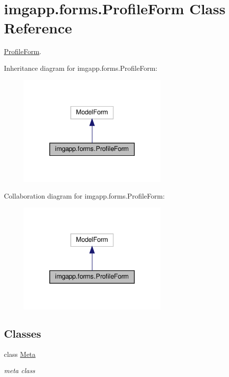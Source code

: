 \hypertarget{classimgapp_1_1forms_1_1ProfileForm}{}\section{imgapp.\+forms.\+Profile\+Form Class Reference}
\label{classimgapp_1_1forms_1_1ProfileForm}


\hyperlink{classimgapp_1_1forms_1_1ProfileForm}{Profile\+Form}.  




Inheritance diagram for imgapp.\+forms.\+Profile\+Form\+:\nopagebreak
\begin{figure}[H]
\begin{center}
\leavevmode
\includegraphics[width=209pt]{classimgapp_1_1forms_1_1ProfileForm__inherit__graph}
\end{center}
\end{figure}


Collaboration diagram for imgapp.\+forms.\+Profile\+Form\+:\nopagebreak
\begin{figure}[H]
\begin{center}
\leavevmode
\includegraphics[width=209pt]{classimgapp_1_1forms_1_1ProfileForm__coll__graph}
\end{center}
\end{figure}
\subsection*{Classes}
\begin{DoxyCompactItemize}
\item 
class \hyperlink{classimgapp_1_1forms_1_1ProfileForm_1_1Meta}{Meta}
\begin{DoxyCompactList}\small\item\em meta class \end{DoxyCompactList}\end{DoxyCompactItemize}


